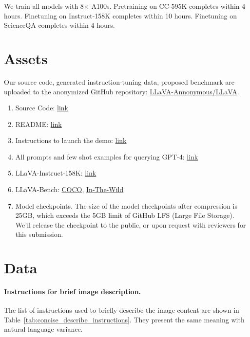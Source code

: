 We train all models with 8$\times$ A100s. Pretraining on CC-595K completes within 4 hours. Finetuning on Instruct-158K completes within 10 hours. Finetuning on ScienceQA completes within 4 hours.

\section{Assets}

Our source code, generated instruction-tuning data, proposed benchmark are uploaded to the anonymized GitHub repository: \href{https://github.com/LLaVA-Annonymous/LLaVA}{LLaVA-Annonymous/LLaVA}.

\begin{enumerate}
    \item Source Code: \href{https://github.com/LLaVA-Annonymous/LLaVA}{link}
    \item README: \href{https://github.com/LLaVA-Annonymous/LLaVA}{link}
    \item Instructions to launch the demo: \href{https://github.com/LLaVA-Annonymous/LLaVA#web-ui}{link}
    \item All prompts and few shot examples for querying GPT-4: \href{https://github.com/LLaVA-Annonymous/LLaVA/tree/master/playground/data/prompts}{link}
    \item LLaVA-Instruct-158K: \href{https://github.com/LLaVA-Annonymous/LLaVA/blob/master/playground/data/llava_instruct_150k.json}{link}
    \item LLaVA-Bench: \href{https://github.com/LLaVA-Annonymous/LLaVA/blob/master/playground/data/coco2014_val_gpt4_qa_30x3.jsonl}{COCO}, \href{https://github.com/LLaVA-Annonymous/LLaVA/tree/master/playground/data/llava_bench_in_the_wild}{In-The-Wild}
    \item Model checkpoints. The size of the model checkpoints after compression is 25GB, which exceeds the 5GB limit of GitHub LFS (Large File Storage).  We'll release the checkpoint to the public, or upon request with reviewers for this submission.
\end{enumerate}

\section{Data}\label{sec:appendix_data}

\paragraph{Instructions for brief image description.}
The list of instructions used to briefly describe the image content are shown in Table~\ref{tab:concise_describe_instructions}. They present the same meaning with natural language variance.


